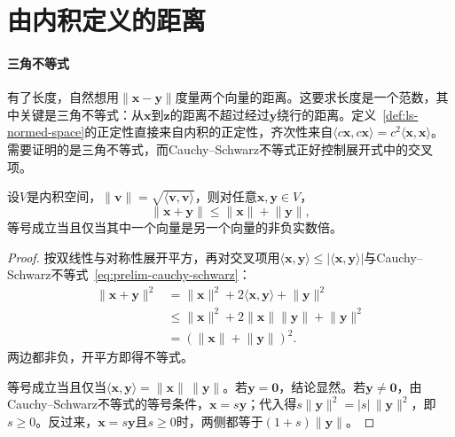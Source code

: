 
\section{由内积定义的距离}
\label{sec:ls-inner-product-distance}

\paragraph{三角不等式}
有了长度，自然想用$\lVert\bm x-\bm y\rVert$度量两个向量的距离。这要求长度是一个范数，其中关键是三角不等式：从$\bm x$到$\bm z$的距离不超过经过$\bm y$绕行的距离。定义~\ref{def:ls-normed-space}的正定性直接来自内积的正定性，齐次性来自$\langle c\bm x,c\bm x\rangle=c^2\langle\bm x,\bm x\rangle$。需要证明的是三角不等式，而Cauchy--Schwarz不等式正好控制展开式中的交叉项。
\begin{theorem}[内积诱导长度的三角不等式]
\label{thm:ls-inner-product-triangle}
设$V$是内积空间，$\lVert\bm v\rVert=\sqrt{\langle\bm v,\bm v\rangle}$，则对任意$\bm x,\bm y\in V$，
\begin{equation}
 \lVert\bm x+\bm y\rVert\leq\lVert\bm x\rVert+\lVert\bm y\rVert,
 \label{eq:ls-inner-product-triangle}
\end{equation}
等号成立当且仅当其中一个向量是另一个向量的非负实数倍。
\end{theorem}
\begin{proof}
按双线性与对称性展开平方，再对交叉项用$\langle\bm x,\bm y\rangle\leq|\langle\bm x,\bm y\rangle|$与Cauchy--Schwarz不等式~\eqref{eq:prelim-cauchy-schwarz}：
\[
 \begin{aligned}
 \lVert\bm x+\bm y\rVert^2
 &=\lVert\bm x\rVert^2+2\langle\bm x,\bm y\rangle+\lVert\bm y\rVert^2\\
 &\leq\lVert\bm x\rVert^2+2\lVert\bm x\rVert\lVert\bm y\rVert+\lVert\bm y\rVert^2\\
 &=(\lVert\bm x\rVert+\lVert\bm y\rVert)^2.
 \end{aligned}
\]
两边都非负，开平方即得不等式。

等号成立当且仅当$\langle\bm x,\bm y\rangle=\lVert\bm x\rVert\,\lVert\bm y\rVert$。若$\bm y=\bm0$，结论显然。若$\bm y\neq\bm0$，由Cauchy--Schwarz不等式的等号条件，$\bm x=s\bm y$；代入得$s\lVert\bm y\rVert^2=|s|\,\lVert\bm y\rVert^2$，即$s\geq0$。反过来，$\bm x=s\bm y$且$s\geq0$时，两侧都等于$(1+s)\lVert\bm y\rVert$。
\end{proof}


